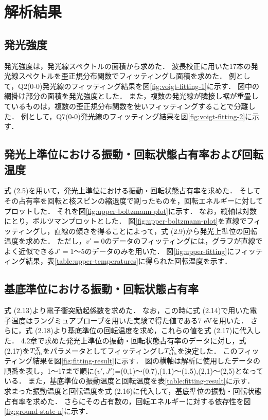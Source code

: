 \chapter{解析結果}

\section{発光強度}
発光強度は，発光線スペクトルの面積から求めた．
波長校正に用いた17本の発光線スペクトルを歪正規分布関数でフィッティングし面積を求めた．
例として，Q2(0-0)発光線のフィッティング結果を図\ref{fig:voigt-fitting-1}に示す．
図中の網掛け部分の面積を発光強度とした．
また，複数の発光線が隣接し裾が重畳しているものは，複数の歪正規分布関数を使いフィッティングすることで分離した．
例として，Q7(0-0)発光線のフィッティング結果を図\ref{fig:voigt-fitting-2}に示す．

\section{発光上準位における振動・回転状態占有率および回転温度}
式 (2.5)を用いて，発光上準位における振動・回転状態占有率を求めた．
そしてその占有率を回転と核スピンの縮退度で割ったものを，回転エネルギーに対してプロットした．
それを図\ref{fig:upper-boltzmann-plot}に示す．
なお，縦軸は対数にとり，ボルツマンプロットとした．
図\ref{fig:upper-boltzmann-plot}を直線でフィッティングし，直線の傾きを得ることによって，式 (2.9)から発光上準位の回転温度を求めた．
ただし，$v'=0$のデータのフィッティングには，グラフが直線でよく近似できる$J'=1〜5$のデータのみを用いた．
図\ref{fig:upper-fitting}にフィッティング結果，表\ref{table:upper-temperatures}に得られた回転温度を示す．

\section{基底準位における振動・回転状態占有率}
式 (2.13)より電子衝突励起係数を求めた．
なお，この時に式 (2.14)で用いた電子温度はラングミュアプローブを用いた実験で得た値である7 eV\cite{yun}を用いた．
さらに，式 (2.18)より基底準位の回転温度を求め，これらの値を式 (2.17)に代入した．
4.2章で求めた発光上準位の振動・回転状態占有率のデータに対し，式 (2.17)を$T^X_{\rm vib}$をパラメータとしてフィッティングし$T^X_{\rm vib}$を決定した．
このフィッティング結果を図\ref{fig:fitting-result}に示す．
図の横軸は解析に使用したデータの順番を表し，1〜17まで順に($v',J'$)=(0,1)〜(0.7),(1,1)〜(1,5),(2,1)〜(2,5)となっている．
また，基底準位の振動温度と回転温度を表\ref{table:fitting-result}に示す．
求まった振動温度と回転温度を式 (2.16)に代入して，基底準位の振動・回転状態占有率を求めた．
さらにその占有数の，回転エネルギーに対する依存性を図\ref{fig:ground-state-n}に示す．